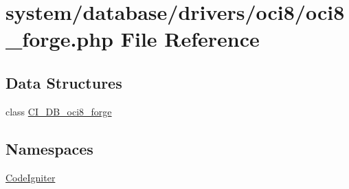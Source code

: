 \hypertarget{oci8__forge_8php}{}\section{system/database/drivers/oci8/oci8\+\_\+forge.php File Reference}
\label{oci8__forge_8php}
\subsection*{Data Structures}
\begin{DoxyCompactItemize}
\item 
class \mbox{\hyperlink{class_c_i___d_b__oci8__forge}{C\+I\+\_\+\+D\+B\+\_\+oci8\+\_\+forge}}
\end{DoxyCompactItemize}
\subsection*{Namespaces}
\begin{DoxyCompactItemize}
\item 
 \mbox{\hyperlink{namespace_code_igniter}{Code\+Igniter}}
\end{DoxyCompactItemize}
